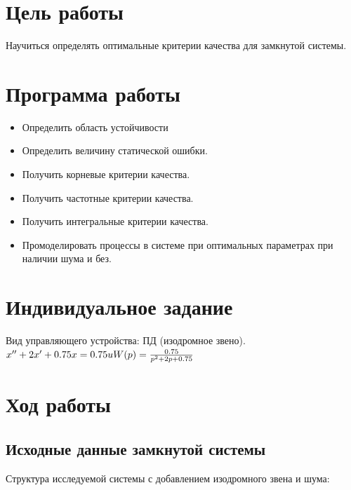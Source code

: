 





\def\contentsname{Содержание}

\tableofcontents
\clearpage

\section{Цель работы}

Научиться определять оптимальные критерии качества для замкнутой системы.

\section{Программа работы}

\begin{itemize}
	\item Определить область устойчивости
	\item Определить величину статической ошибки.
	\item Получить корневые критерии качества.
	\item Получить частотные критерии качества.
	\item Получить интегральные критерии качества.
	\item Промоделировать процессы в системе при оптимальных параметрах при наличии шума и без.
\end{itemize}

\section{Индивидуальное задание}
Вид управляющего устройства: ПД (изодромное звено).\\
$x'' + 2x' + 0.75x = 0.75u\\
W(p) = \frac{0.75}{p^2 + 2p + 0.75}$

\newpage
\section{Ход работы}

\subsection{Исходные данные замкнутой системы}

Структура исследуемой системы с добавлением изодромного звена и шума:

